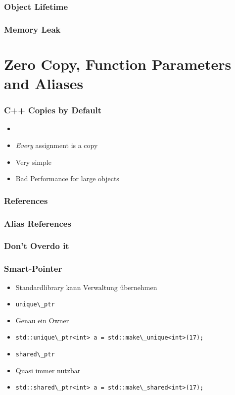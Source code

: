 \documentclass[usenames,dvipsnames,svgnames,table,aspectratio=169]{beamer}
\begin{document}
\begin{frame}
    \frametitle{Object Lifetime}
    
\end{frame}

\begin{frame}
    \frametitle{Memory Leak}
    
\end{frame}


\section{Zero Copy, Function Parameters and Aliases}
\begin{frame}
    \frametitle{C++ Copies by Default}
    \begin{itemize}
        \item<+-> 
        \item<+-> \textit{Every} assignment is a copy
        \item<+-> Very simple
        \item<+-> Bad Performance for large objects
    \end{itemize}
\end{frame}

\begin{frame}
    \frametitle{References}
    
\end{frame}

\begin{frame}
    \frametitle{Alias References}
    
\end{frame}

\begin{frame}
    \frametitle{Don't Overdo it}
    
\end{frame}

\begin{frame}
    \frametitle{Smart-Pointer}
    \begin{itemize}
        \item Standardlibrary kann Verwaltung übernehmen
            \pause
        \item \lstinline{unique\_ptr}
            \pause
        \item Genau ein Owner
            \pause
        \item
            \lstinline{std::unique\_ptr<int> a = std::make\_unique<int>(17);}
            \pause
        \item \lstinline{shared\_ptr}
            \pause
        \item Quasi immer nutzbar
            \pause
        \item
            \lstinline{std::shared\_ptr<int> a = std::make\_shared<int>(17);}
    \end{itemize}
\end{frame}
\end{document}
